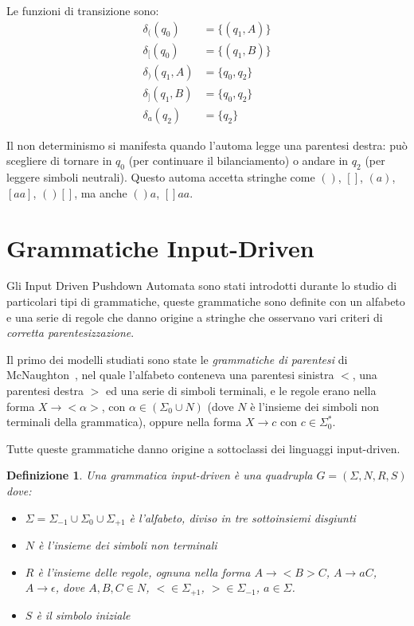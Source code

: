 \documentclass[a4paper,12pt]{report}
\newtheorem{definition}{Definizione}[chapter]
\theoremstyle{propositionstyle}
\begin{document}
    Le funzioni di transizione sono:
    \begin{align}
        \delta_{(}(q_0) &= \{(q_1, A)\} \\
        \delta_{[}(q_0) &= \{(q_1, B)\} \\
        \delta_{)}(q_1, A) &= \{q_0, q_2\} \\
        \delta_{]}(q_1, B) &= \{q_0, q_2\} \\
        \delta_{a}(q_2) &= \{q_2\}
    \end{align}

    Il non determinismo si manifesta quando l'automa legge una parentesi destra: può scegliere di tornare in $q_0$ (per continuare il bilanciamento) o andare in $q_2$ (per leggere simboli neutrali).
    Questo automa accetta stringhe come $()$, $[]$, $(a)$, $[aa]$, $()[]$, ma anche $()a$, $[]aa$.


    \section{Grammatiche Input-Driven}

    Gli Input Driven Pushdown Automata sono stati introdotti durante lo studio di particolari tipi di grammatiche, queste grammatiche sono definite
    con un alfabeto e una serie di regole che danno origine a stringhe che osservano vari criteri di \textit{corretta parentesizzazione}.

    Il primo dei modelli studiati sono state le \textit{grammatiche di parentesi} di McNaughton~\cite{mcnaughton}, nel quale l'alfabeto conteneva una parentesi sinistra $<$, una parentesi destra $>$
    ed una serie di simboli terminali, e le regole erano nella forma $X \rightarrow <\alpha>$, con $\alpha \in \left(\Sigma_0 \cup N\right)$ (dove $N$ è l'insieme dei simboli non terminali della grammatica), oppure nella forma $X \rightarrow c$ con $c \in \Sigma_0^*$.

    Tutte queste grammatiche danno origine a sottoclassi dei linguaggi input-driven.

    \begin{definition}
        Una grammatica input-driven è una quadrupla $G = \left(\Sigma, N, R, S\right)$ dove:
        \begin{itemize}
            \item $\Sigma = \Sigma_{-1} \cup \Sigma_0 \cup \Sigma_{+1}$ è l'alfabeto, diviso in tre sottoinsiemi disgiunti
            \item $N$ è l'insieme dei simboli non terminali
            \item $R$ è l'insieme delle regole, ognuna nella forma $A \rightarrow <B>C$, $A \rightarrow aC$, $A \rightarrow \epsilon$, dove $A, B, C \in N$, $< \in \Sigma_{+1}$, $> \in \Sigma_{-1}$, $a \in \Sigma$.
            \item $S$ è il simbolo iniziale
        \end{itemize}
    \end{definition}
\end{document}
